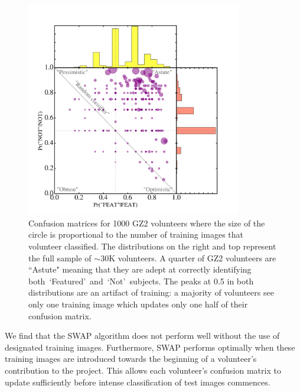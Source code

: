\documentclass[twocolumn]{aastex6}
\newcommand{\feat}{`Featured'}
\newcommand{\notfeat}{`Not'}
\begin{document}
\begin{figure}[t!]
\includegraphics[width=3.7in]{figures/test_user_probs.png}
\caption{Confusion matrices for 1000 GZ2 volunteers where the size of the circle is proportional to the number of training images that volunteer classified. The distributions on the right and top represent the full sample of $\sim$30K volunteers. A quarter of GZ2 volunteers are ``Astute" meaning that they are adept at correctly identifying both~\feat~and~\notfeat~subjects. The peaks at 0.5 in both distributions are an artifact of training: a majority of volunteers see only one training image which updates only one half of their confusion matrix. \label{fig: volunteer training}}
\end{figure}

We find that the SWAP algorithm does not perform well without the use of designated 
training images. Furthermore, SWAP performs optimally when these training images
are introduced towards the beginning of a volunteer's contribution to the project. 
This allows each volunteer's confusion matrix to update sufficiently before intense 
classification of test images commences. 
\end{document}
